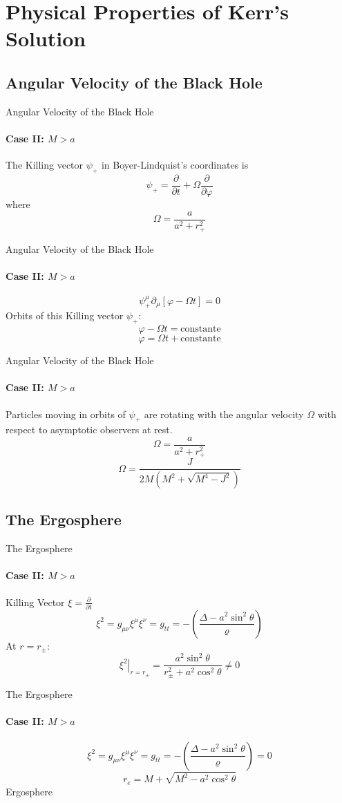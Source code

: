 \documentclass{beamer}
\begin{document}
	\section{Physical Properties of Kerr's Solution}    
  	\begin{darkframes}
        
        \subsection{Angular Velocity of the Black Hole}
        \begin{frame}{Angular Velocity of the Black Hole}
        \framesubtitle{Case II: $M>a$}
        The Killing vector $\psi_{+}$ in Boyer-Lindquist's coordinates is
		$$\psi_{+}=\frac{\partial}{\partial t}+\Omega\frac{\partial}{\partial\varphi}$$
		where 
		$$\Omega=\frac{a}{a^{2}+r_{+}^{2}}$$
        \end{frame}
        
        \begin{frame}{Angular Velocity of the Black Hole}
       	\framesubtitle{Case II: $M>a$}
        	$$\psi_{+}^{\mu}\partial_{\mu}\left[\varphi-\Omega t\right] = 0$$
            \pause
            Orbits of this Killing vector $\psi_{+}$:
            $$\varphi-\Omega t=\textrm{constante}$$
            \pause
            $$\varphi=\Omega t+\textrm{constante}$$
        \end{frame}
        
        \begin{frame}{Angular Velocity of the Black Hole}
       	\framesubtitle{Case II: $M>a$}
        	Particles moving in orbits of $\psi_{+}$ are rotating with the angular velocity $\Omega$ with respect to asymptotic observers at rest.
            $$\Omega=\frac{a}{a^{2}+r_{+}^{2}}$$
            \pause
            $$\Omega = \frac{J}{2M\left(M^{2}+\sqrt{M^{4}-J^{2}}\right)}$$
        \end{frame}
  		
        \subsection{The Ergosphere}
        \begin{frame}{The Ergosphere}
       	\framesubtitle{Case II: $M>a$}
			Killing Vector
            $\xi=\frac{\partial}{\partial t}$
            \pause
            $$\xi^{2}=g_{\mu\nu}\xi^{\mu}\xi^{\nu}=g_{tt}=-\left(\frac{\Delta-a^{2}\sin^{2}\theta}{\varrho}\right)$$
            \pause
            At $r=r_{\pm}$:
			$$\left.\xi^{2}\right|_{r=r_{\pm}}=\frac{a^{2}\sin^{2}\theta}{r_{\pm}^{2}+a^{2}\cos^{2}\theta}\neq0$$
        \end{frame}
        
        \begin{frame}{The Ergosphere}
       	\framesubtitle{Case II: $M>a$}
            $$\xi^{2}=g_{\mu\nu}\xi^{\mu}\xi^{\nu}=g_{tt}=-\left(\frac{\Delta-a^{2}\sin^{2}\theta}{\varrho}\right) =0$$
            \pause
            $$r_e = M+\sqrt{M^{2}-a^{2}\cos^{2}\theta}$$
			\pause
            \centering
            Ergosphere
        \end{frame}
        
   	\end{darkframes}
    
\end{document}
